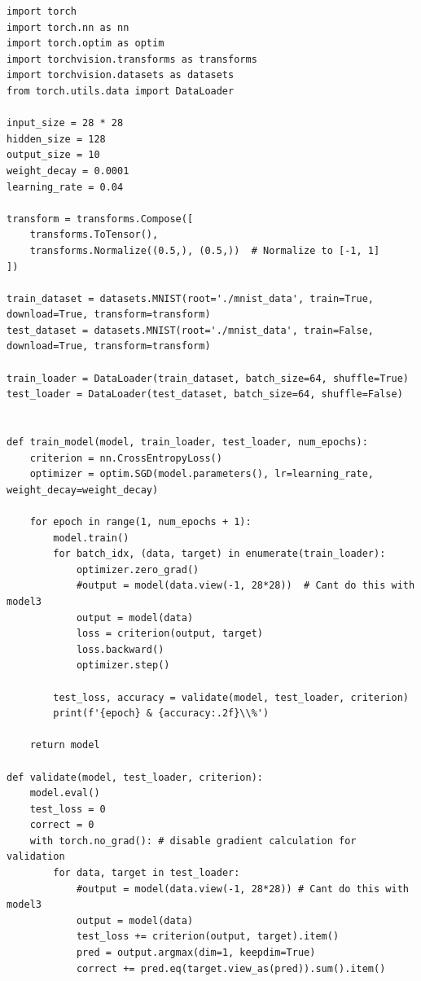 \documentclass[a4paper]{article}
\begin{document}
\begin{table}[h!]
\begin{lstlisting}
import torch
import torch.nn as nn
import torch.optim as optim
import torchvision.transforms as transforms
import torchvision.datasets as datasets
from torch.utils.data import DataLoader

input_size = 28 * 28
hidden_size = 128
output_size = 10
weight_decay = 0.0001
learning_rate = 0.04

transform = transforms.Compose([
    transforms.ToTensor(),
    transforms.Normalize((0.5,), (0.5,))  # Normalize to [-1, 1]
])

train_dataset = datasets.MNIST(root='./mnist_data', train=True, download=True, transform=transform)
test_dataset = datasets.MNIST(root='./mnist_data', train=False, download=True, transform=transform)

train_loader = DataLoader(train_dataset, batch_size=64, shuffle=True)
test_loader = DataLoader(test_dataset, batch_size=64, shuffle=False)


def train_model(model, train_loader, test_loader, num_epochs):
    criterion = nn.CrossEntropyLoss()
    optimizer = optim.SGD(model.parameters(), lr=learning_rate, weight_decay=weight_decay)

    for epoch in range(1, num_epochs + 1):
        model.train()
        for batch_idx, (data, target) in enumerate(train_loader):
            optimizer.zero_grad()
            #output = model(data.view(-1, 28*28))  # Cant do this with model3
            output = model(data)
            loss = criterion(output, target)
            loss.backward()
            optimizer.step()
        
        test_loss, accuracy = validate(model, test_loader, criterion)
        print(f'{epoch} & {accuracy:.2f}\\%')
    
    return model

def validate(model, test_loader, criterion):
    model.eval()
    test_loss = 0
    correct = 0
    with torch.no_grad(): # disable gradient calculation for validation
        for data, target in test_loader:
            #output = model(data.view(-1, 28*28)) # Cant do this with model3
            output = model(data)
            test_loss += criterion(output, target).item()
            pred = output.argmax(dim=1, keepdim=True) 
            correct += pred.eq(target.view_as(pred)).sum().item()


\end{lstlisting}
\end{table}
\end{document}
